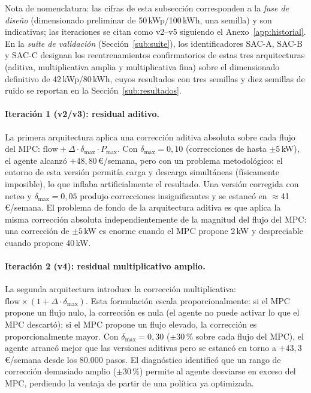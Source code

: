 \documentclass[12pt, a4paper, twoside]{report}
\begin{document}
Nota de nomenclatura: las cifras de esta subsección corresponden a la
\emph{fase de diseño} (dimensionado preliminar de 50\,kWp/100\,kWh, una
semilla) y son indicativas; las iteraciones se citan como v2--v5 siguiendo el
Anexo~\ref{app:historial}. En la \emph{suite de validación}
(Sección~\ref{sub:suite}), los identificadores SAC-A, SAC-B y SAC-C designan
los reentrenamientos confirmatorios de estas tres arquitecturas (aditiva,
multiplicativa amplia y multiplicativa fina) sobre el dimensionado definitivo
de 42\,kWp/80\,kWh, cuyos resultados con tres semillas y diez semillas de
ruido se reportan en la Sección~\ref{sub:resultados}.

\paragraph{Iteración 1 (v2/v3): residual aditivo.}
La primera arquitectura aplica una corrección aditiva absoluta sobre cada flujo
del MPC: $\text{flow} + \Delta \cdot \delta_{\max} \cdot P_{\max}$. Con
$\delta_{\max} = 0{,}10$ (correcciones de hasta $\pm5$\,kW), el agente alcanzó
$+48{,}80$\,€/semana, pero con un problema metodológico: el entorno de esta
versión permitía carga y descarga simultáneas (físicamente imposible), lo que
inflaba artificialmente el resultado. Una versión corregida con neteo y
$\delta_{\max} = 0{,}05$ produjo correcciones insignificantes y se estancó en
$\approx$41\,€/semana. El problema de fondo de la arquitectura aditiva es que
aplica la misma corrección absoluta independientemente de la magnitud del flujo
del MPC: una corrección de $\pm5$\,kW es enorme cuando el MPC propone 2\,kW y
despreciable cuando propone 40\,kW.

\paragraph{Iteración 2 (v4): residual multiplicativo amplio.}
La segunda arquitectura introduce la corrección multiplicativa:
$\text{flow} \times (1 + \Delta \cdot \delta_{\max})$. Esta formulación escala
proporcionalmente: si el MPC propone un flujo nulo, la corrección es nula (el
agente no puede activar lo que el MPC descartó); si el MPC propone un flujo
elevado, la corrección es proporcionalmente mayor. Con $\delta_{\max} = 0{,}30$
($\pm30\,\%$ sobre cada flujo del MPC), el agente arrancó mejor que las
versiones aditivas pero se estancó en torno a $+43{,}3$\,€/semana desde los
80.000 pasos. El diagnóstico identificó que un rango de corrección demasiado
amplio ($\pm30\,\%$) permite al agente desviarse en exceso del MPC, perdiendo la
ventaja de partir de una política ya optimizada.
\end{document}
